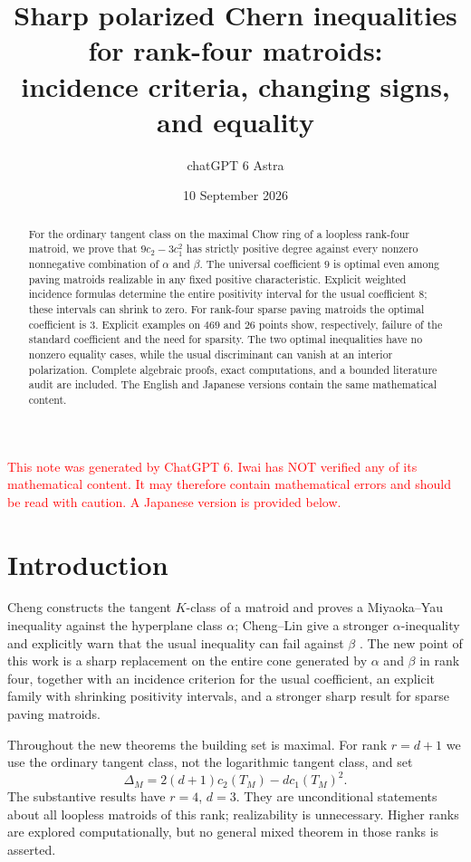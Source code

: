 \documentclass[12pt]{amsart}
\title[Polarized Chern inequalities for matroids]{Sharp polarized Chern inequalities for rank-four matroids:\\incidence criteria, changing signs, and equality}
\author{chatGPT 6 Astra}
\date{10 September 2026}
\theoremstyle{definition}
\theoremstyle{remark}
\numberwithin{equation}{section}
\newcommand{\xr}[1]{\textcolor{red}{#1}}
\begin{document}
\begin{abstract}
For the ordinary tangent class on the maximal Chow ring of a loopless rank-four matroid, we prove that $9c_2-3c_1^2$ has strictly positive degree against every nonzero nonnegative combination of $\alpha$ and $\beta$. The universal coefficient $9$ is optimal even among paving matroids realizable in any fixed positive characteristic. Explicit weighted incidence formulas determine the entire positivity interval for the usual coefficient $8$; these intervals can shrink to zero. For rank-four sparse paving matroids the optimal coefficient is $3$. Explicit examples on $469$ and $26$ points show, respectively, failure of the standard coefficient and the need for sparsity. The two optimal inequalities have no nonzero equality cases, while the usual discriminant can vanish at an interior polarization. Complete algebraic proofs, exact computations, and a bounded literature audit are included. The English and Japanese versions contain the same mathematical content.
\end{abstract}
\maketitle
\setcounter{tocdepth}{1}
\tableofcontents

\xr{This note was generated by ChatGPT 6. Iwai has NOT verified any of its mathematical content. It may therefore contain mathematical errors and should be read with caution. A Japanese version is provided below.}

\section{Introduction}
Cheng constructs the tangent $K$-class of a matroid and proves a Miyaoka--Yau inequality against the hyperplane class $\alpha$; Cheng--Lin give a stronger $\alpha$-inequality and explicitly warn that the usual inequality can fail against $\beta$ \cite{Che,CL,CheG}. The new point of this work is a sharp replacement on the entire cone generated by $\alpha$ and $\beta$ in rank four, together with an incidence criterion for the usual coefficient, an explicit family with shrinking positivity intervals, and a stronger sharp result for sparse paving matroids.

Throughout the new theorems the building set is maximal. For rank $r=d+1$ we use the ordinary tangent class, not the logarithmic tangent class, and set
\[
 \Delta_M=2(d+1)c_2(T_M)-d c_1(T_M)^2.
\]
The substantive results have $r=4$, $d=3$. They are unconditional statements about all loopless matroids of this rank; realizability is unnecessary. Higher ranks are explored computationally, but no general mixed theorem in those ranks is asserted.
\end{document}
